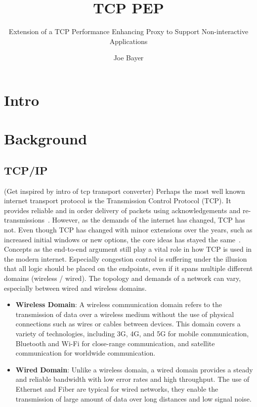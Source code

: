 \documentclass[a4paper,english, 11pt]{report}
\author{Joe Bayer}
\title{TCP PEP}
\subtitle{Extension of a TCP Performance Enhancing Proxy to
Support Non-interactive Applications}
\begin{document}
\uiomasterfp[program={Informatics: Programming and System Architecture}, supervisors={Michael Welzl\and Kristjon Ciko}]

\tableofcontents

\chapter{Intro}

\chapter{Background}

\section{TCP/IP}
(Get inspired by intro of tcp transport converter)
Perhaps the most well known internet transport protocol is the Transmission Control Protocol (TCP). It provides reliable and in order delivery of packets using acknowledgements and re-transmissions~\cite{Eddy_2022}. However, as the demands of the internet has changed, TCP has not. Even though TCP has changed with minor extensions over the years, such as increased initial windows or new options, the core ideas has stayed the same~\cite{rfc8803}. Concepts as the end-to-end argument still play a vital role in how TCP is used in the modern internet. Especially congestion control is suffering under the illusion that all logic should be placed on the endpoints, even if it spans multiple different domains (wireless / wired). The topology and demands of a network can vary, especially between wired and wireless domains.
\begin{itemize}
  \item \textbf{Wireless Domain}: A wireless communication domain refers to the transmission of data over a wireless medium without the use of physical connections such as wires or cables between devices. This domain covers a variety of technologies, including 3G, 4G, and 5G for mobile communication, Bluetooth and Wi-Fi for close-range communication, and satellite communication for worldwide communication.
  \item \textbf{Wired Domain}: Unlike a wireless domain, a wired domain provides a steady and reliable bandwidth with low error rates and high throughput. The use of Ethernet and Fiber are typical for wired networks, they enable the transmission of large amount of data over long distances and low signal noise. 
\end{itemize}
\end{document}
